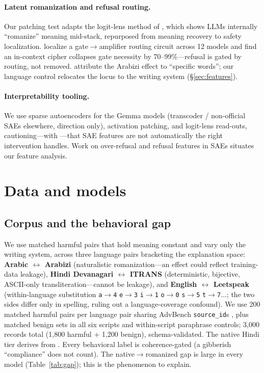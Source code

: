 \documentclass[11pt]{article}
\newcommand{\arr}{$\rightarrow$}
\begin{document}
\paragraph{Latent romanization and refusal routing.} Our patching test adapts the logit-lens method of \citet{saji2025}, which shows LLMs internally ``romanize'' meaning mid-stack, repurposed from meaning recovery to safety localization. \citet{frank2026} localize a gate\arr amplifier routing circuit across 12 models and find an in-context cipher collapses gate necessity by 70--99\%---refusal is gated by routing, not removed. \citet{alghanim2024} attribute the Arabizi effect to ``specific words''; our language control relocates the locus to the writing system (\S\ref{sec:features}).

\paragraph{Interpretability tooling.} We use sparse autoencoders \citep{lieberum2024,mcdougall2025} for the Gemma models (transcoder / non-official SAEs elsewhere, direction only), activation patching, and logit-lens read-outs, cautioning---with \citet{arad2025}---that SAE features are not automatically the right intervention handles. Work on over-refusal \citep{maskey2026} and refusal features in SAEs \citep{yeo2025} situates our feature analysis.

\section{Data and models}

\subsection{Corpus and the behavioral gap}
\label{sec:corpus}
We use matched harmful pairs that hold meaning constant and vary only the writing system, across three language pairs bracketing the explanation space: \textbf{Arabic $\leftrightarrow$ Arabizi} (naturalistic romanization---an effect could reflect training-data leakage), \textbf{Hindi Devanagari $\leftrightarrow$ ITRANS} (deterministic, bijective, ASCII-only transliteration---cannot be leakage), and \textbf{English $\leftrightarrow$ Leetspeak} (within-language substitution \texttt{a}\arr\texttt{4} \texttt{e}\arr\texttt{3} \texttt{i}\arr\texttt{1} \texttt{o}\arr\texttt{0} \texttt{s}\arr\texttt{5} \texttt{t}\arr\texttt{7}$\dots$; the two sides differ only in spelling, ruling out a language-coverage confound). We use 200 matched harmful pairs per language pair sharing AdvBench \texttt{source\_id}s \citep{zou2023}, plus matched benign sets in all six scripts and within-script paraphrase controls; 3{,}000 records total (1{,}800 harmful + 1{,}200 benign), schema-validated. The native Hindi tier derives from \citet{joshi2025}. Every behavioral label is coherence-gated (a gibberish ``compliance'' does not count). The native\arr romanized gap is large in every model (Table~\ref{tab:gap}); this is the phenomenon to explain.
\end{document}
